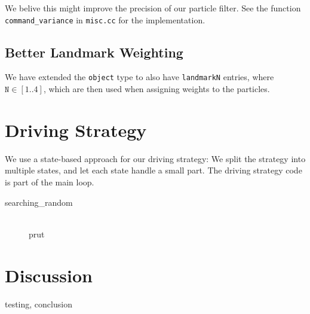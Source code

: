 \documentclass[a4paper,12pt]{article}
\begin{document}
We belive this might improve the precision of our particle filter.  See the
function \texttt{command_variance} in \texttt{misc.cc} for the implementation.


\subsection{Better Landmark Weighting}

We have extended the \texttt{object} type to also have \texttt{landmarkN}
entries, where $\texttt{N} \in [1..4]$, which are then used when assigning
weights to the particles.


\section{Driving Strategy}

We use a state-based approach for our driving strategy: We split the strategy
into multiple states, and let each state handle a small part.  The driving
strategy code is part of the main loop.

\begin{description}
\item[searching_random]\hfill\\
prut\end{description}



\section{Discussion}

testing, conclusion
\end{document}
